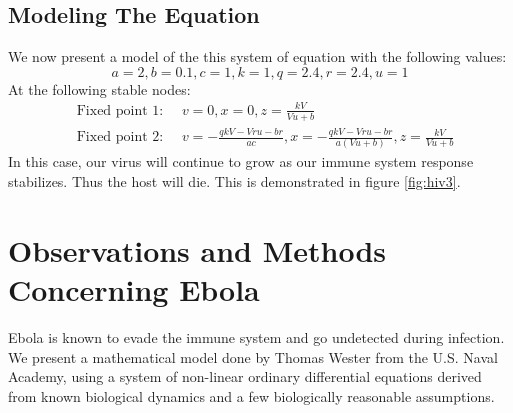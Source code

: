 \documentclass{article}
\begin{document}
\subsection{Modeling The Equation}
We now present a model of the this system of equation with the following values:
\begin{equation}
a=2,b= 0.1,c=1,k=1,q= 2.4,r= 2.4,u=1
\end{equation}
At the following stable nodes:
\begin{equation}
\begin{split}
&\text{Fixed point 1: } \quad v=0,x=0,z={\frac {kV}{Vu+b}}   \\
&\text{Fixed point 2: } \quad  v=-{\frac {qkV-Vru-br}{ac}},x=-{\frac {qkV-Vru-br}{a \left( Vu+b \right) }},z={\frac {kV}{Vu+b}}
\end{split}
\label{eq:fixed}
\end{equation}
In this case, our virus will continue to grow as our immune system response stabilizes. Thus the host will die. 
This is demonstrated in figure \ref{fig:hiv3}.




\section{Observations and Methods Concerning Ebola}

Ebola is known to evade the immune system and go undetected during infection. We present a mathematical model done by Thomas Wester from the U.S. Naval Academy, using a system of non-linear ordinary differential equations derived from known biological dynamics and a few biologically reasonable assumptions.
\end{document}
